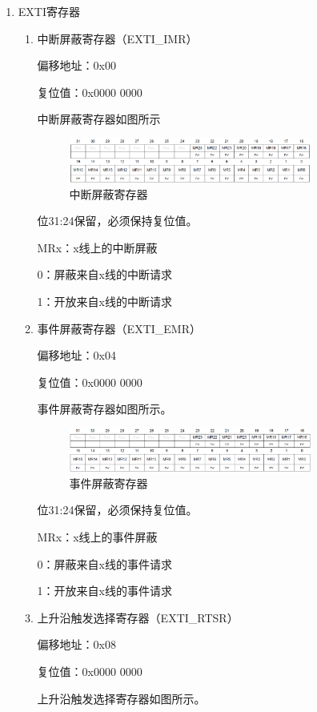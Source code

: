 ﻿\documentclass[UTF8,12pt]{article}
\begin{document}
\begin{enumerate}
  \item EXTI寄存器
  
  \begin{enumerate}
    \item 中断屏蔽寄存器（EXTI\_IMR）
    
    偏移地址：0x00

    复位值：0x0000 0000

    中断屏蔽寄存器如图所示
    \begin{figure}[htbp]
      \centering
      \includegraphics[width=0.8\textwidth]{imgs/5.png}
      \caption{中断屏蔽寄存器}
    \end{figure}

    位31:24保留，必须保持复位值。

    MRx：x线上的中断屏蔽

    0：屏蔽来自x线的中断请求

    1：开放来自x线的中断请求

    \item 事件屏蔽寄存器（EXTI\_EMR）
    
    偏移地址：0x04

    复位值：0x0000 0000

    事件屏蔽寄存器如图所示。

    \begin{figure}[htbp]
      \centering
      \includegraphics[width=0.8\textwidth]{imgs/6.png}
      \caption{事件屏蔽寄存器}
    \end{figure}

    位31:24保留，必须保持复位值。

    MRx：x线上的事件屏蔽

    0：屏蔽来自x线的事件请求

    1：开放来自x线的事件请求

    \item 上升沿触发选择寄存器（EXTI\_RTSR）
    
    偏移地址：0x08

    复位值：0x0000 0000

    上升沿触发选择寄存器如图所示。


\end{enumerate}
\end{enumerate}
\end{document}
